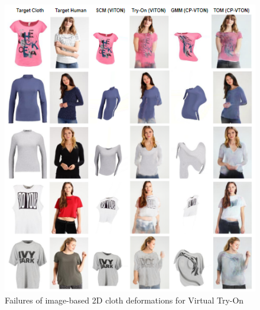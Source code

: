 \begin{figure}[t]
\centering
\includegraphics[scale=0.6]{figures/2dvton_diff.png}
\caption{Failures of image-based 2D cloth deformations for Virtual Try-On}
\label{fig:2dvtondiff}
\end{figure}



